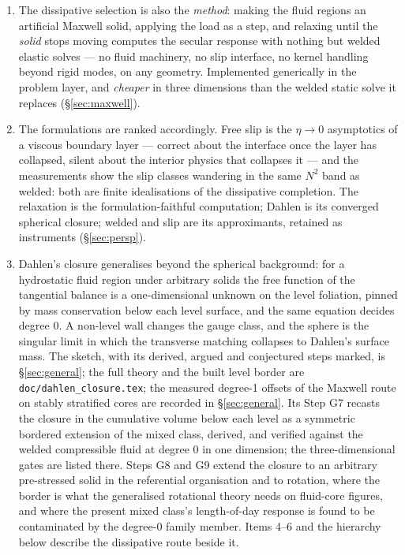 \documentclass[11pt]{article}
\newcommand{\code}[1]{\texttt{#1}}
\begin{document}
\begin{enumerate}
  $N^2$ six orders of magnitude below plausible values has buoyancy
  periods of years against loading periods of millennia --- so the
  Dahlen closure is the physically correct static limit there, and the
  entire ambiguity quantified below is practically negligible for GIA
  next to, say, three-dimensional viscosity variations. The interest
  of the result is conceptual, and for bodies or observables where
  core stratification itself is the target (\S\ref{sec:persp}).
\item The dissipative selection is also the \emph{method}: making the fluid regions an artificial Maxwell
  solid, applying the load as a step, and relaxing until the
  \emph{solid} stops moving computes the secular response with
  nothing but welded elastic solves --- no fluid machinery, no slip
  interface, no kernel handling beyond rigid modes, on any geometry.
  Implemented generically in the problem layer, and \emph{cheaper}
  in three dimensions than the welded static solve it replaces
  (\S\ref{sec:maxwell}).
\item The formulations are ranked accordingly. Free slip is the
  $\eta \to 0$ asymptotics of a viscous boundary layer --- correct
  about the interface once the layer has collapsed, silent about the
  interior physics that collapses it --- and the measurements show
  the slip classes wandering in the same $N^2$ band as welded: both
  are finite idealisations of the dissipative completion. The
  relaxation is the formulation-faithful computation; Dahlen is its
  converged spherical closure; welded and slip are its
  approximants, retained as instruments (\S\ref{sec:persp}).
\item Dahlen's closure generalises beyond the spherical background:
  for a hydrostatic fluid region under arbitrary solids the free
  function of the tangential balance is a one-dimensional unknown on
  the level foliation, pinned by mass conservation below each level
  surface, and the same equation decides degree 0. A non-level wall
  changes the gauge class, and the sphere is the singular limit in
  which the transverse matching collapses to Dahlen's surface mass. The
  sketch, with its derived, argued and conjectured steps marked, is
  \S\ref{sec:general}; the full theory and the built level border are
  \code{doc/dahlen\_closure.tex}; the measured degree-1 offsets of the
  Maxwell route on stably stratified cores are recorded in
  \S\ref{sec:general}.
  Its Step G7 recasts the closure in the cumulative volume below each
  level as a symmetric bordered extension of the mixed class, derived,
  and verified against the welded compressible fluid at degree 0 in one
  dimension; the three-dimensional gates are listed there. Steps G8
  and G9 extend the closure to an arbitrary pre-stressed solid in the
  referential organisation and to rotation, where the border is what
  the generalised rotational theory needs on fluid-core figures, and
  where the present mixed class's length-of-day response is found to
  be contaminated by the degree-0 family member.
  Items 4--6 and the hierarchy below describe the dissipative route
  beside it.
\end{enumerate}
\end{document}
